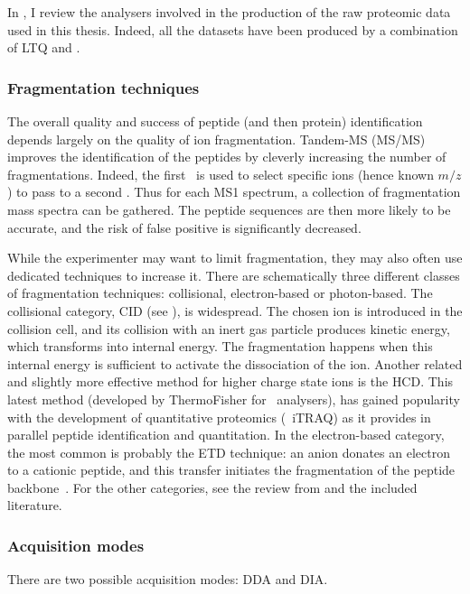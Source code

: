 In ,
I review the analysers involved in
the production of the raw proteomic data used in this thesis.
Indeed, all the datasets have been
produced by a combination of \acrfull{LTQ} and \orbi.\mybr\

\subsubsection{Fragmentation techniques~}

The overall quality and success of peptide (and then protein)
identification depends largely on the quality of ion fragmentation.
Tandem-\gls{MS} (\gls{MS/MS}) improves the identification of the peptides
by cleverly increasing the number of fragmentations.
Indeed, the first \ms\ is
used to select specific ions (hence known $m/z$) to pass to a second \ms.
Thus for each MS1 spectrum, a collection of fragmentation mass spectra
can be gathered. The peptide sequences are then more likely to be accurate, and
the risk of false positive is significantly decreased.\mybr\

While the experimenter may want to limit fragmentation,
they may also often use dedicated techniques to increase it.
There are schematically three different classes of fragmentation techniques:
collisional, electron-based or photon-based.
The collisional category, \gls{CID} (see ),
is widespread.
The chosen ion is introduced in the collision cell,
and its collision with an inert gas particle produces kinetic energy,
which transforms into internal energy.
The fragmentation happens when this internal energy is sufficient to activate
the dissociation of the ion.
Another related and slightly more effective method
for higher charge state ions is the \acrfull{HCD}.
This latest method (developed by ThermoFisher for \orbi\ analysers),
has gained popularity with the development of quantitative proteomics
(\eg\ \gls{iTRAQ})
as it provides in parallel peptide identification and quantitation.
In the electron-based category,
the most common is probably the \acrfull{ETD} technique:
an anion donates an electron to a cationic peptide,
and this transfer initiates
the fragmentation of the peptide backbone~.
For the other categories,
see the review from \citet{Zhang2014} and the included literature.\mybr\

\subsubsection{Acquisition modes}\label{subsub:msAcquisitionMode}
There are two possible acquisition modes: \gls{DDA} and \gls{DIA}.\mybr\

